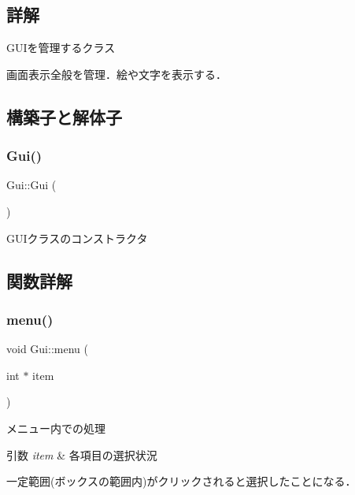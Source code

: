 \subsection{詳解}
G\+U\+Iを管理するクラス 

画面表示全般を管理．絵や文字を表示する． 

\subsection{構築子と解体子}
\mbox{\label{class_gui_ab2655dbb6d3a91d7e90cb83dad6c0450}} 
\subsubsection{\texorpdfstring{Gui()}{Gui()}}
{\footnotesize\ttfamily Gui\+::\+Gui (\begin{DoxyParamCaption}{ }\end{DoxyParamCaption})\hspace{0.3cm}{\ttfamily [inline]}}



G\+U\+Iクラスのコンストラクタ 



\subsection{関数詳解}
\mbox{\label{class_gui_a5a9a47abd40187c04a2761804efe2bb7}} 
\subsubsection{\texorpdfstring{menu()}{menu()}}
{\footnotesize\ttfamily void Gui\+::menu (\begin{DoxyParamCaption}\item[{int $\ast$}]{item }\end{DoxyParamCaption})\hspace{0.3cm}{\ttfamily [inline]}}



メニュー内での処理 


\begin{DoxyParams}{引数}
{\em item} & 各項目の選択状況\\
\hline
\end{DoxyParams}
一定範囲(ボックスの範囲内)がクリックされると選択したことになる． \mbox{\label{class_gui_a2bedfb4563e53061c62f110fbe4d15ed}} 
